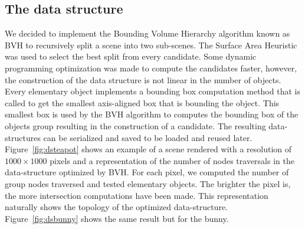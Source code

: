 \documentclass[a4paper,11pt]{article}%
\begin{document}
\subsection*{The data structure}
We decided to implement the Bounding Volume Hierarchy algorithm known as BVH to recursively split a scene into two sub-scenes.
The Surface Area Heuristic was used to select the best split from every candidate.
Some dynamic programming optimization was made to compute the candidates faster, however, the construction of the data structure is not linear in the number of objects.
Every elementary object implements a bounding box computation method that is called to get the smallest axis-aligned box that is bounding the object.
This smallest box is used by the BVH algorithm to computes the bounding box of the objects group resulting in the construction of a candidate.
The resulting data-structures can be serialized and saved to be loaded and reused later.
Figure~\ref{fig:dsteapot} shows an example of a scene rendered with a resolution of $1000\times1000$ pixels and a representation of the number of nodes traversals in the data-structure optimized by BVH.
For each pixel, we computed the number of group nodes traversed and tested elementary objects. The brighter the pixel is, the more intersection computations have been made. This representation naturally shows the
topology of the optimized data-structure. Figure~\ref{fig:dsbunny} shows the same result but for the bunny.
\end{document}
